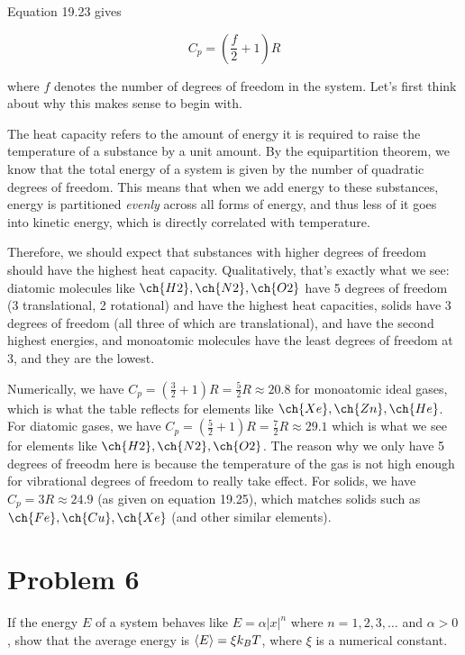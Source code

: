 \documentclass[10pt]{article}
\begin{document}
\begin{solution}

    Equation 19.23 gives

    \[ C_p = \left( \frac{f}{2} + 1\right) R\] 

    where $f$ denotes the number of degrees of freedom in the system. Let's first think about why this makes sense to begin with.

    The heat capacity refers to the amount of energy it is required to raise the temperature of a substance by a unit amount. By the equipartition theorem, we know that the total energy of a system is given by the number of quadratic degrees of freedom. This means that when we add energy to these substances, energy is partitioned \textit{evenly} across all forms of energy, and thus less of it goes into kinetic energy, which is directly correlated with temperature. 

    Therefore, we should expect that substances with higher degrees of freedom should have the highest heat capacity. Qualitatively, that's exactly what we see: diatomic molecules like $\ch{H2}, \ch{N2}, \ch{O2}$ have 5 degrees of freedom (3 translational, 2 rotational) and have the highest heat capacities, solids have 3 degrees of freedom (all three of which are translational), and have the second highest energies, and monoatomic molecules have the least degrees of freedom at 3, and they are the lowest.

    Numerically, we have $C_p = \left(\frac{3}{2} + 1\right)R = \frac{5}{2}R \approx 20.8$ for monoatomic ideal gases, which is what the table reflects for elements like $\ch{Xe}, \ch{Zn}, \ch{He}$. For diatomic gases, we have $C_p = \left(\frac{5}{2} + 1\right) R = \frac{7}{2} R \approx 29.1$ which is what we see for elements like $\ch{H2}, \ch{N2}, \ch{O2}$. The reason why we only have 5 degrees of freeodm here is because the temperature of the gas is not high enough for vibrational degrees of freedom to really take effect. For solids, we have $C_p = 3R \approx 24.9$ (as given on equation 19.25), which matches solids such as $\ch{Fe}, \ch{Cu}, \ch{Xe}$ (and other similar elements).


\end{solution}

\pagebreak
\section*{Problem 6}

If the energy $E$ of a system behaves like $E = \alpha|x|^n$ where $n = 1, 2, 3, \dots$ and $\alpha > 0$, show that the average energy is $\langle E \rangle = \xi k_BT$, where $\xi$ is a numerical constant.
\end{document}

